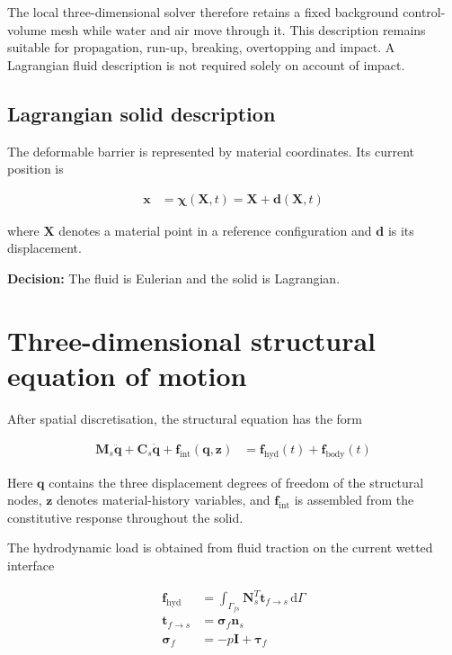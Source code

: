 \documentclass[11pt,a4paper]{article}
\newcommand{\decision}[1]{\textbf{Decision:} #1}
\begin{document}
The local three-dimensional solver therefore retains a fixed background control-volume mesh while water and air move through it. This description remains suitable for propagation, run-up, breaking, overtopping and impact. A Lagrangian fluid description is not required solely on account of impact.

\subsection{Lagrangian solid description}
\label{subsec:lagrangian-solid}

The deformable barrier is represented by material coordinates. Its current position is

\begin{align}
\bm{x} &= \bm{\chi}(\bm{X},t)
       = \bm{X} + \bm{d}(\bm{X},t)
\label{eq:solid-motion}
\end{align}

where \(\bm{X}\) denotes a material point in a reference configuration and \(\bm{d}\) is its displacement.

\decision{The fluid is Eulerian and the solid is Lagrangian.}

\section{Three-dimensional structural equation of motion}
\label{sec:structural-eom}

After spatial discretisation, the structural equation has the form

\begin{align}
\bm{M}_{s}\ddot{\bm{q}}
+ \bm{C}_{s}\dot{\bm{q}}
+ \bm{f}_{\mathrm{int}}(\bm{q},\bm{z})
&=
\bm{f}_{\mathrm{hyd}}(t)
+ \bm{f}_{\mathrm{body}}(t)
\label{eq:structural-eom}
\end{align}

Here \(\bm{q}\) contains the three displacement degrees of freedom of the structural nodes, \(\bm{z}\) denotes material-history variables, and \(\bm{f}_{\mathrm{int}}\) is assembled from the constitutive response throughout the solid.

The hydrodynamic load is obtained from fluid traction on the current wetted interface

\begin{align}
\bm{f}_{\mathrm{hyd}}
&=
\int_{\Gamma_{fs}}
\bm{N}_{s}^{T}\bm{t}_{f\rightarrow s}\,\mathrm{d}\Gamma
\label{eq:hydrodynamic-load-vector}
\\
\bm{t}_{f\rightarrow s}
&=
\bm{\sigma}_{f}\bm{n}_{s}
\label{eq:fluid-traction}
\\
\bm{\sigma}_{f}
&=
-p\bm{I}+\bm{\tau}_{f}
\label{eq:fluid-stress}
\end{align}
\end{document}
